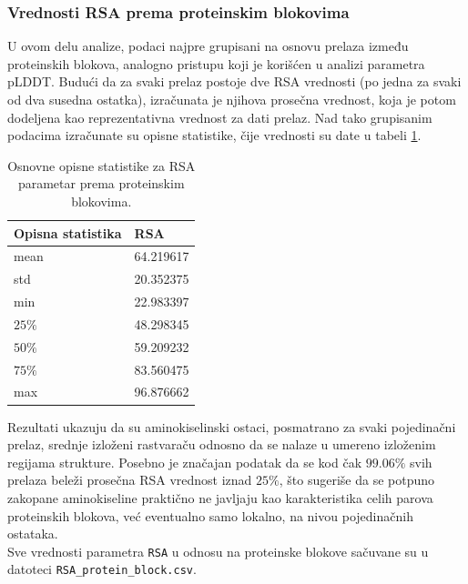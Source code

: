 \documentclass[a4paper,12pt]{article}
\begin{document}
\subsubsection{Vrednosti RSA prema proteinskim blokovima}
U ovom delu analize, podaci najpre grupisani na osnovu prelaza između proteinskih blokova, analogno pristupu koji je korišćen u analizi parametra pLDDT. Budući da za svaki prelaz postoje dve RSA vrednosti (po jedna za svaki od dva susedna ostatka), izračunata je njihova prosečna vrednost, koja je potom dodeljena kao reprezentativna vrednost za dati prelaz. Nad tako grupisanim podacima izračunate su opisne statistike, čije vrednosti su date u tabeli \ref{Tabela:10}.
\begin{table}[h!]
    \centering
    \begin{tabular}{ |l|l| } 
    \hline
    \textbf{Opisna statistika} & \textbf{RSA} \\
    \hline
    mean & 64.219617 \\
    std  & 20.352375 \\
    min  & 22.983397 \\
    $25\%$  & 48.298345 \\
    $50\%$  & 59.209232 	\\
    $75\%$ & 83.560475\\
    max & 96.876662 	\\
    \hline
    \end{tabular}
    \caption{Osnovne opisne statistike za RSA parametar prema proteinskim blokovima.}
    \label{Tabela:10}
\end{table}

Rezultati ukazuju da su aminokiselinski ostaci, posmatrano za svaki pojedinačni prelaz, srednje izloženi rastvaraču odnosno da se nalaze u umereno izloženim regijama strukture. Posebno je značajan podatak da se kod čak $99.06\%$ svih prelaza beleži prosečna RSA vrednost iznad $25\%$, što sugeriše da se potpuno zakopane aminokiseline praktično ne javljaju kao karakteristika celih parova proteinskih blokova, već eventualno samo lokalno, na nivou pojedinačnih ostataka. \\
Sve vrednosti parametra \texttt{RSA} u odnosu na proteinske blokove sačuvane su u datoteci \texttt{RSA\_protein\_block.csv}.
\end{document}
